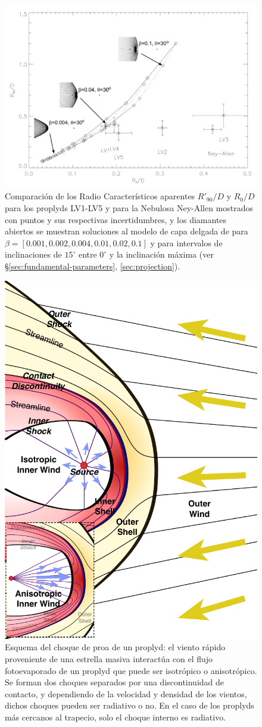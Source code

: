 \begin{figure}
  \centering
  \includegraphics[width=0.7\linewidth]{./Figures/robberto}
  \caption{Comparación de los Radio Característicos aparentes $R'_{90}/D$ y $R_0/D$ para los proplyds LV1-LV5 y para la Nebulosa Ney-Allen mostrados con puntos y sus respectivas incertidumbres, y los diamantes abiertos se muestran soluciones al modelo de capa delgada de \citep{Canto:1996} para $\beta=[0.001, 0.002, 0.004, 0.01, 0.02, 0.1]$ y para intervalos de inclinaciones de $15^\circ$ entre $0^\circ$ y la inclinación máxima (ver \S \ref{sec:fundamental-parameters}, \ref{sec:projection}).}
  \label{fig:Robberto}
\end{figure}

\begin{figure}
  \centering
  \includegraphics[width=0.7\linewidth]{./Figures/generic-bowshock}
  \caption{Esquema del choque de proa de un proplyd: el viento rápido proveniente de una estrella masiva interactúa con el flujo fotoevaporado de un proplyd que puede ser isotrópico o anisotrópico. Se forman dos choques separados por una discontinuidad de contacto, y dependiendo de la velocidad y densidad de los vientos, dichos choques pueden ser radiativo o no. En el caso de los proplyds más cercanos al trapecio, solo el choque interno es radiativo.}
  \label{fig:generic-bowshock}
\end{figure}


